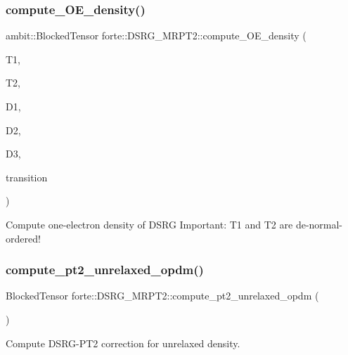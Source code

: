 \subsubsection{\texorpdfstring{compute\+\_\+\+O\+E\+\_\+density()}{compute\_OE\_density()}}
{\footnotesize\ttfamily ambit\+::\+Blocked\+Tensor forte\+::\+D\+S\+R\+G\+\_\+\+M\+R\+P\+T2\+::compute\+\_\+\+O\+E\+\_\+density (\begin{DoxyParamCaption}\item[{Blocked\+Tensor \&}]{T1,  }\item[{Blocked\+Tensor \&}]{T2,  }\item[{Blocked\+Tensor \&}]{D1,  }\item[{Blocked\+Tensor \&}]{D2,  }\item[{Blocked\+Tensor \&}]{D3,  }\item[{const bool \&}]{transition }\end{DoxyParamCaption})}

Compute one-\/electron density of D\+S\+RG Important\+: T1 and T2 are de-\/normal-\/ordered! \mbox{\label{classforte_1_1_d_s_r_g___m_r_p_t2_af07239692f00078b36d57ce66517ad40}} 
\subsubsection{\texorpdfstring{compute\+\_\+pt2\+\_\+unrelaxed\+\_\+opdm()}{compute\_pt2\_unrelaxed\_opdm()}}
{\footnotesize\ttfamily Blocked\+Tensor forte\+::\+D\+S\+R\+G\+\_\+\+M\+R\+P\+T2\+::compute\+\_\+pt2\+\_\+unrelaxed\+\_\+opdm (\begin{DoxyParamCaption}{ }\end{DoxyParamCaption})\hspace{0.3cm}{\ttfamily [protected]}}



Compute D\+S\+R\+G-\/\+P\+T2 correction for unrelaxed density. 

\mbox{\label{classforte_1_1_d_s_r_g___m_r_p_t2_af254509d7ec7a2f9d0fa985dc4e603e4}} 
